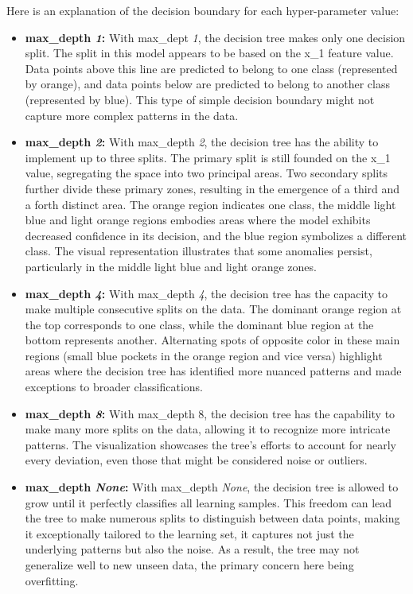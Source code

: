 \documentclass[acmconf,nonacm=true]{acmart}
\begin{document}
\begin{enumerate}
\begin{enumerate}
        Here is an explanation of the decision boundary for each hyper-parameter value:
        \begin{itemize}
            \item \textbf{max\_depth \textit{1}:} With max\_dept \textit{1}, the decision tree makes only one decision split. The split in this model appears to be based on the x\_1 feature value. Data points above this line are predicted to belong to one class (represented by orange), and data points below are predicted to belong to another class (represented by blue). This type of simple decision boundary might not capture more complex patterns in the data.
            \item \textbf{max\_depth \textit{2}:} With max\_depth \textit{2}, the decision tree has the ability to implement up to three splits. The primary split is still founded on the x\_1 value, segregating the space into two principal areas. Two secondary splits further divide these primary zones, resulting in the emergence of a third and a forth distinct area. The orange region indicates one class, the middle light blue and light orange regions embodies areas where the model exhibits decreased confidence in its decision, and the blue region symbolizes a different class. The visual representation illustrates that some anomalies persist, particularly in the middle light blue and light orange zones.
            \item \textbf{max\_depth \textit{4}:} With max\_depth \textit{4}, the decision tree has the capacity to make multiple consecutive splits on the data. The dominant orange region at the top corresponds to one class, while the dominant blue region at the bottom represents another. Alternating spots of opposite color in these main regions (small blue pockets in the orange region and vice versa) highlight areas where the decision tree has identified more nuanced patterns and made exceptions to broader classifications.
            \item \textbf{max\_depth \textit{8}:} With max\_depth 8, the decision tree has the capability to make many more splits on the data, allowing it to recognize more intricate patterns. The visualization showcases the tree's efforts to account for nearly every deviation, even those that might be considered noise or outliers.
            \item \textbf{max\_depth \textit{None}:} With max\_depth \textit{None}, the decision tree is allowed to grow until it perfectly classifies all learning samples. This freedom can lead the tree to make numerous splits to distinguish between data points, making it exceptionally tailored to the learning set, it captures not just the underlying patterns but also the noise. As a result, the tree may not generalize well to new unseen data, the primary concern here being overfitting.
        \end{itemize}
        

\end{enumerate}
\end{enumerate}
\end{document}
